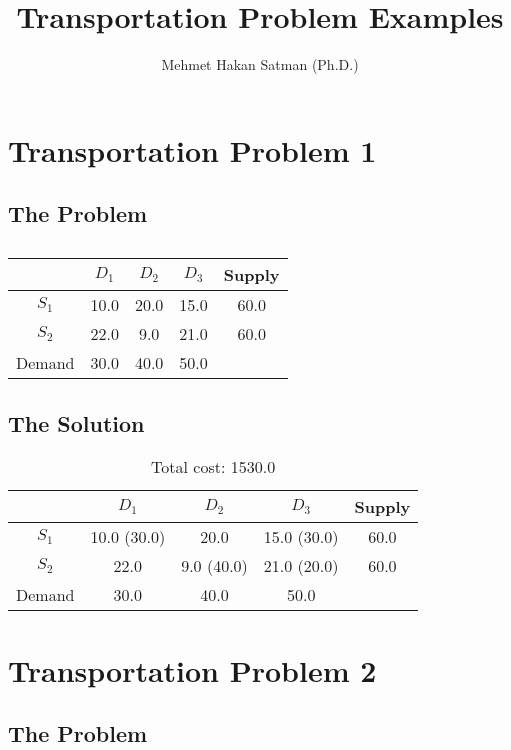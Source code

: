 \documentclass{article}
\begin{document}
\title{Transportation Problem Examples}
\author{Mehmet Hakan Satman (Ph.D.)}
\maketitle
\tableofcontents

\section{Transportation Problem 1}
\subsection{The Problem}
\begin{table}[H]
\begin{tabular}{|c|c|c|c|c|}
\hline
     & $D_1$ & $D_2$ & $D_3$ & Supply \\
\hline
$S_1$ & 10.0 & 20.0 & 15.0 & 60.0\\
$S_2$ & 22.0 & 9.0 & 21.0 & 60.0\\
\hline
Demand & 30.0 & 40.0 & 50.0 & \\
\hline
\end{tabular}
\label{tbl:}
\caption{}
\end{table}

\subsection{The Solution}
\begin{table}[H]
\begin{tabular}{|c|c|c|c|c|}
\hline
     & $D_1$ & $D_2$ & $D_3$ & Supply \\
\hline
$S_1$ & 10.0 \tiny{(30.0)} & 20.0 & 15.0 \tiny{(30.0)} & 60.0\\
$S_2$ & 22.0 & 9.0 \tiny{(40.0)} & 21.0 \tiny{(20.0)} & 60.0\\
\hline
Demand & 30.0 & 40.0 & 50.0 & \\
\hline
\end{tabular}
\label{tbl:}
\caption{Total cost: 1530.0}
\end{table}


\section{Transportation Problem 2}

\subsection{The Problem}
\end{document}
